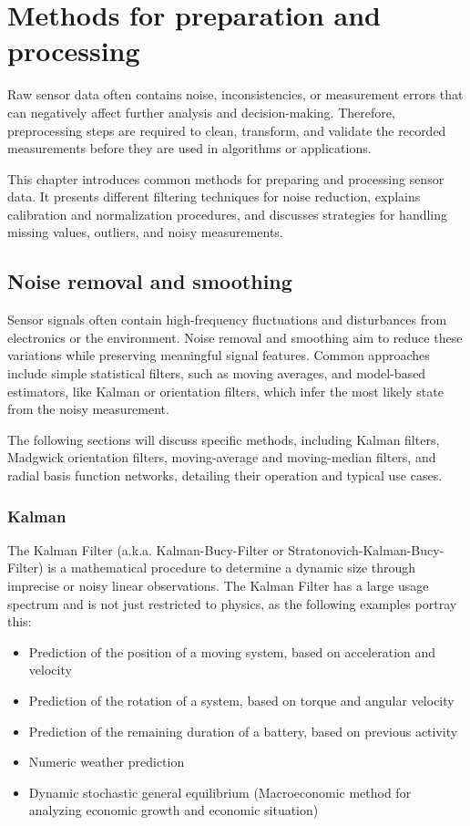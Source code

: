 \chapter{Methods for preparation and processing}\label{title:processing}
Raw sensor data often contains  noise, inconsistencies, or measurement errors that can negatively affect further analysis and decision-making. Therefore, preprocessing steps are required to clean, transform, and validate the recorded measurements before they are used in algorithms or applications.

This chapter introduces common methods for preparing and processing sensor data. It presents different filtering techniques for noise reduction, explains calibration and normalization procedures, and discusses strategies for handling missing values, outliers, and noisy measurements.

\section{Noise removal and smoothing}\label{title:noise-removal}
Sensor signals often contain high-frequency fluctuations and disturbances from electronics or the environment. Noise removal and smoothing aim to reduce these variations while preserving meaningful signal features. Common approaches include simple statistical filters, such as moving averages, and model-based estimators, like Kalman or orientation filters, which infer the most likely state from the noisy measurement.

The following sections will discuss specific methods, including Kalman filters, Madgwick orientation filters, moving-average and moving-median filters, and radial basis function networks, detailing their operation and typical use cases.

\subsection{Kalman}\label{title:kalman}
The Kalman Filter (a.k.a. Kalman-Bucy-Filter or Stratonovich-Kalman-Bucy-Filter) is a mathematical procedure to determine a dynamic size through imprecise or noisy linear observations. The Kalman Filter has a large usage spectrum and is not just restricted to physics, as the following examples portray this:

\begin{itemize}
    \item Prediction of the position of a moving system, based on acceleration and velocity
    \item Prediction of the rotation of a system, based on torque and angular velocity
    \item Prediction of the remaining duration of a battery, based on previous activity
    \item Numeric weather prediction
    \item Dynamic stochastic general equilibrium (Macroeconomic method for analyzing economic growth and economic situation)
\end{itemize}

